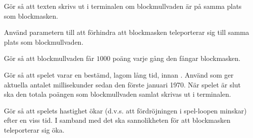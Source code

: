 \Subtask Gör så att texten  skrivs ut i terminalen om blockmullvaden är på samma plats som blockmasken.

\Subtask Använd parametern  till att förhindra att blockmasken teleporterar sig till samma plats som blockmullvaden.

\Subtask Gör så att blockmullvaden får $1000$ poäng varje gång den fångar blockmasken.

\Subtask Gör så att spelet varar en bestämd, lagom lång tid, innan . Använd  som ger aktuella antalet millisekunder sedan den förste januari 1970. När spelet är slut ska den totala poängen som blockmullvaden samlat skrivas ut i terminalen.

\Subtask Gör så att spelets hastighet ökar (d.v.s. att fördröjningen i spel-loopen minskar) efter en viss tid. I samband med det ska sannolikheten för att blockmasken teleporterar sig öka.
